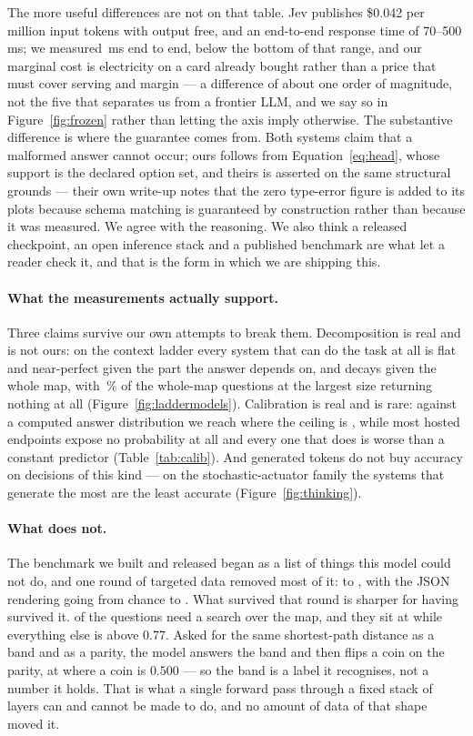 \documentclass[11pt]{article}
\newcommand{\1}{\mathbf{1}}
\begin{document}
The more useful differences are not on that table. Jev publishes \$0.042 per million input tokens
with output free, and an end-to-end response time of 70--500\,ms; we measured
\oursMsPerDecision{}\,ms end to end, below the bottom of that range, and our marginal cost is
electricity on a card already bought rather than a price that must cover serving and margin --- a
difference of about one order of magnitude, not the five that separates us from a frontier LLM, and
we say so in Figure~\ref{fig:frozen} rather than letting the axis imply otherwise. The substantive
difference is where the guarantee comes from. Both systems claim that a malformed answer cannot
occur; ours follows from Equation~\eqref{eq:head}, whose support is the declared option set, and
theirs is asserted on the same structural grounds --- their own write-up notes that the zero
type-error figure is added to its plots because schema matching is guaranteed by construction
rather than because it was measured. We agree with the reasoning. We also think a released
checkpoint, an open inference stack and a published benchmark are what let a reader check it, and
that is the form in which we are shipping this.

\paragraph{What the measurements actually support.} Three claims survive our own attempts to break
them. Decomposition is real and is not ours: on the context ladder every system that can do the
task at all is flat and near-perfect given the part the answer depends on, and decays given the
whole map, with \ladderSilentGlobal{}\,\% of the whole-map questions at the largest size returning
nothing at all (Figure~\ref{fig:laddermodels}). Calibration is real and is rare: against a computed
answer distribution we reach \simOursAccEvent{} where the ceiling is \simCeilEvent{}, while most
hosted endpoints expose no probability at all and every one that does is worse than a constant
predictor (Table~\ref{tab:calib}). And generated tokens do not buy accuracy on decisions of this
kind --- on the stochastic-actuator family the systems that generate the most are the least accurate
(Figure~\ref{fig:thinking}).

\paragraph{What does not.} The benchmark we built and released began as a list of things this
model could not do, and one round of targeted data removed most of it: \spatialOursBefore{} to
\spatialOursAcc{}, with the JSON rendering going from chance to \surfJson{}. What survived that
round is sharper for having survived it. \searchFamN{} of the questions need a search over the
map, and they sit at \searchFamAcc{} while everything else is above 0.77. Asked for the same
shortest-path distance as a band and as a parity, the model answers the band and then flips a
coin on the parity, at \probeCond{} where a coin is $0.500$ --- so the band is a label it
recognises, not a number it holds. That is what a single forward pass through a fixed stack of
layers can and cannot be made to do, and no amount of data of that shape moved it.
\end{document}
